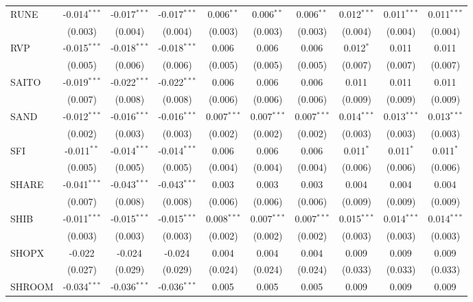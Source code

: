 \begin{table}[!htbp]
\begin{tabular}{@{\extracolsep{5pt}}lccccccccc}
 RUNE & -0.014$^{***}$ & -0.017$^{***}$ & -0.017$^{***}$ & 0.006$^{**}$ & 0.006$^{**}$ & 0.006$^{**}$ & 0.012$^{***}$ & 0.011$^{***}$ & 0.011$^{***}$ \\
  & (0.003) & (0.004) & (0.004) & (0.003) & (0.003) & (0.003) & (0.004) & (0.004) & (0.004) \\
 RVP & -0.015$^{***}$ & -0.018$^{***}$ & -0.018$^{***}$ & 0.006$^{}$ & 0.006$^{}$ & 0.006$^{}$ & 0.012$^{*}$ & 0.011$^{}$ & 0.011$^{}$ \\
  & (0.005) & (0.006) & (0.006) & (0.005) & (0.005) & (0.005) & (0.007) & (0.007) & (0.007) \\
 SAITO & -0.019$^{***}$ & -0.022$^{***}$ & -0.022$^{***}$ & 0.006$^{}$ & 0.006$^{}$ & 0.006$^{}$ & 0.011$^{}$ & 0.011$^{}$ & 0.011$^{}$ \\
  & (0.007) & (0.008) & (0.008) & (0.006) & (0.006) & (0.006) & (0.009) & (0.009) & (0.009) \\
 SAND & -0.012$^{***}$ & -0.016$^{***}$ & -0.016$^{***}$ & 0.007$^{***}$ & 0.007$^{***}$ & 0.007$^{***}$ & 0.014$^{***}$ & 0.013$^{***}$ & 0.013$^{***}$ \\
  & (0.002) & (0.003) & (0.003) & (0.002) & (0.002) & (0.002) & (0.003) & (0.003) & (0.003) \\
 SFI & -0.011$^{**}$ & -0.014$^{***}$ & -0.014$^{***}$ & 0.006$^{}$ & 0.006$^{}$ & 0.006$^{}$ & 0.011$^{*}$ & 0.011$^{*}$ & 0.011$^{*}$ \\
  & (0.005) & (0.005) & (0.005) & (0.004) & (0.004) & (0.004) & (0.006) & (0.006) & (0.006) \\
 SHARE & -0.041$^{***}$ & -0.043$^{***}$ & -0.043$^{***}$ & 0.003$^{}$ & 0.003$^{}$ & 0.003$^{}$ & 0.004$^{}$ & 0.004$^{}$ & 0.004$^{}$ \\
  & (0.007) & (0.008) & (0.008) & (0.006) & (0.006) & (0.006) & (0.009) & (0.009) & (0.009) \\
 SHIB & -0.011$^{***}$ & -0.015$^{***}$ & -0.015$^{***}$ & 0.008$^{***}$ & 0.007$^{***}$ & 0.007$^{***}$ & 0.015$^{***}$ & 0.014$^{***}$ & 0.014$^{***}$ \\
  & (0.003) & (0.003) & (0.003) & (0.002) & (0.002) & (0.002) & (0.003) & (0.003) & (0.003) \\
 SHOPX & -0.022$^{}$ & -0.024$^{}$ & -0.024$^{}$ & 0.004$^{}$ & 0.004$^{}$ & 0.004$^{}$ & 0.009$^{}$ & 0.009$^{}$ & 0.009$^{}$ \\
  & (0.027) & (0.029) & (0.029) & (0.024) & (0.024) & (0.024) & (0.033) & (0.033) & (0.033) \\
 SHROOM & -0.034$^{***}$ & -0.036$^{***}$ & -0.036$^{***}$ & 0.005$^{}$ & 0.005$^{}$ & 0.005$^{}$ & 0.009$^{}$ & 0.009$^{}$ & 0.009$^{}$ \\

\end{tabular}
\end{table}
